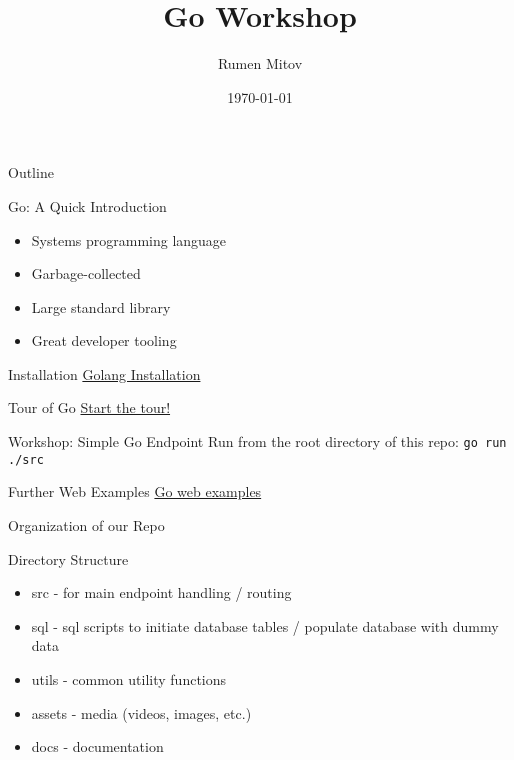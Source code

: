 \documentclass[presentation]{beamer}
\author{Rumen Mitov}
\date{\today}
\title{Go Workshop}
\begin{document}
\maketitle
\begin{frame}{Outline}
\tableofcontents
\end{frame}


\begin{frame}[label={sec:org5c24fbe}]{Go: A Quick Introduction}
\begin{itemize}
\item Systems programming language
\item Garbage-collected
\item Large standard library
\item Great developer tooling
\end{itemize}
\end{frame}

\begin{frame}[label={sec:org790e5c1}]{Installation}
\href{https://go.dev/doc/install}{Golang Installation}
\end{frame}

\begin{frame}[label={sec:orgbc6e130}]{Tour of Go}
\href{https://go.dev/tour/list}{Start the tour!}
\end{frame}

\begin{frame}[label={sec:org3742f35},fragile]{Workshop: Simple Go Endpoint}
 Run from the root directory of this repo: \texttt{go run ./src}
\end{frame}

\begin{frame}[label={sec:orgf891335}]{Further Web Examples}
\href{https://gowebexamples.com/}{Go web examples}
\end{frame}

\begin{frame}[label={sec:orgd8c5bfd}]{Organization of our Repo}
\end{frame}

\begin{frame}[label={sec:org9508b8e}]{Directory Structure}
\begin{itemize}
\item \alert{src} - for main endpoint handling / routing
\item \alert{sql} - sql scripts to initiate database tables / populate database with dummy data
\item \alert{utils} - common utility functions
\item \alert{assets} - media (videos, images, etc.)
\item \alert{docs} - documentation
\end{itemize}
\end{frame}
\end{document}
